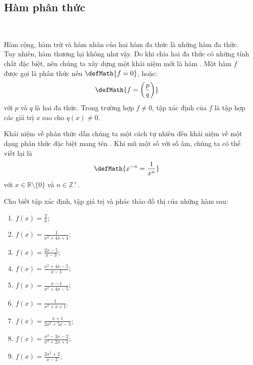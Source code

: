 \subsection{Hàm phân thức}

\ %

Hàm cộng, hàm trừ và hàm nhân của hai hàm đa thức là những hàm đa thức. Tuy nhiên, hàm thương lại không như vậy. Do khi chia hai đa thức có những tính chất đặc biệt, nên chúng ta xây dựng một khái niệm mới là hàm . Một hàm $f$ được gọi là phân thức nếu $\defMath{f = 0}$, hoặc: $$\defMath{f = \left(\frac{p}{q}\right)}$$ với $p$ và $q$ là hai đa thức. Trong trường hợp $f \neq 0$, tập xác định của $f$ là tập hợp các giá trị $x$ sao cho $q(x) \neq 0$. 

Khái niệm về phân thức dẫn chúng ta một cách tự nhiên đến khái niệm về một dạng phân thức đặc biệt mang tên . Khi mũ một số với số âm, chúng ta có thể viết lại là $$\defMath{x^{-n} = \frac{1}{x^n}}$$ với $x \in \mathbb{R} \setminus \{0\}$ và $n \in \mathbb{Z}^+$.

\exercise Cho biết tập xác định, tập giá trị và phác thảo đồ thị của những hàm sau:
\begin{multicols}{3}
   \begin{enumerate}
      \item $\displaystyle f(x) = \frac{2}{x}$;
      \item $\displaystyle f(x) = \frac{1}{x^2 + 4x + 4}$;
      \item $\displaystyle f(x) = \frac{2x - 5}{x - 3}$;
      \item $\displaystyle f(x) = \frac{x^2 + 4x - 5}{x - 1}$;
      \item $\displaystyle f(x) = \frac{x - 1}{x^2 + 4x - 5}$;
      \item $\displaystyle f(x) = \frac{1}{x^2 + x + 1}$.
      \item $\displaystyle f(x) = \frac{x + 1}{2x^2 + 5x - 3}$;
      \item $\displaystyle f(x) = \frac{x^2 - 3x - 2}{x^2 + 2x + 1}$;
      \item $\displaystyle f(x) = \frac{2x^2 + 2}{x - 2}$;
   \end{enumerate}
\end{multicols}

\solution

